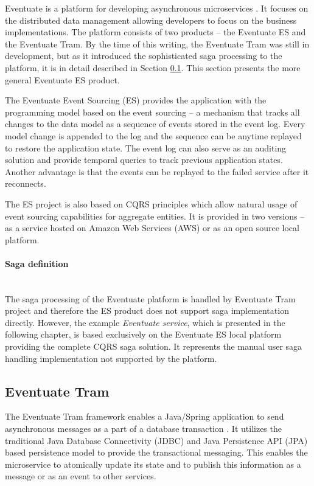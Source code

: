 \documentclass[oneside,
  digital, %
  table,   %
  lof,     %
  lot,     %
]{fithesis3}
\newcommand{\newlinepar}[1]{\paragraph{#1}\needspace{3\baselineskip}\mbox{}\\}
\begin{document}
Eventuate is a platform for developing asynchronous microservices \cite{eventuate.io}. It focuses on the distributed data management allowing developers to focus on the business implementations. The platform consists of two products -- the Eventuate ES and the Eventuate Tram. By the time of this writing, the Eventuate Tram was still in development, but as it introduced the sophisticated saga processing to the platform, it is in detail described in Section \ref{sec:eventuate-tram}. This section presents the more general Eventuate ES product.

The Eventuate Event Sourcing (ES) provides the application with the programming model based on the event sourcing -- a mechanism that tracks all changes to the data model as a sequence of events stored in the event log. Every model change is appended to the log and the sequence can be anytime replayed to restore the application state. The event log can also serve as an auditing solution and provide temporal queries to track previous application states. Another advantage is that the events can be replayed to the failed service after it reconnects.


The ES project is also based on CQRS principles which allow natural usage of event sourcing capabilities for aggregate entities. It is provided in two versions -- as a service hosted on Amazon Web Services (AWS) or as an open source local platform.

\newlinepar{Saga definition}

The saga processing of the Eventuate platform is handled by Eventuate Tram project and therefore the ES product does not support saga implementation directly. However, the example \textit{Eventuate service}, which is presented in the following chapter, is based exclusively on the Eventuate ES local platform providing the complete CQRS saga solution. It represents the manual user saga handling implementation not supported by the platform. 

\subsection{Eventuate Tram}
\label{sec:eventuate-tram}

The Eventuate Tram framework enables a Java/Spring application to send asynchronous messages as a part of a database transaction \cite{eventuate-tram}. It utilizes the traditional Java Database Connectivity (JDBC) and Java Persistence API (JPA) based persistence model to provide the transactional messaging. This enables the microservice to atomically update its state and to publish this information as a message or as an event to other services.
\end{document}
